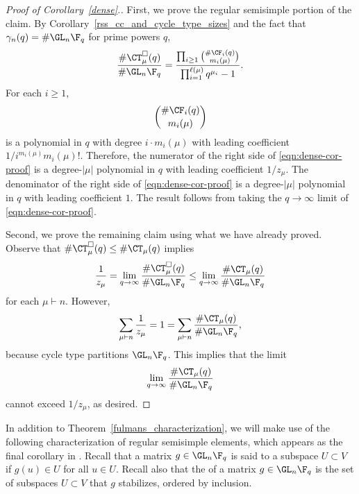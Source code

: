 \begin{proof}[Proof of Corollary~\ref{dense}.]
First, we prove the regular semisimple portion of the claim.
By Corollary~\ref{rss_cc_and_cycle_type_sizes} and the fact that \(\gamma_n (q) = \# \GL_n \F_q\) for prime powers \(q\),
\begin{equation}
\label{eqn:dense-cor-proof}
\frac{\#\CT_\mu^\Box (q)}{\# \GL_n \F_q} = \frac{\prod_{i \geq 1} \binom{\# \CF_i (q)}{m_i(\mu)}}{\prod_{i=1}^{\ell(\mu)} q^{\mu_i}-1}.
\end{equation}
For each \(i \geq 1\),
\begin{equation}
\binom{\# \CF_i (q)}{m_i (\mu)}
\end{equation}
is a polynomial in \(q\) with degree \(i \cdot m_i (\mu)\) with leading coefficient \(1 / i^{m_i(\mu)} m_i(\mu)!\).
Therefore, the numerator of the right side of \eqref{eqn:dense-cor-proof} is a degree-\(|\mu|\) polynomial in \(q\) with leading coefficient \(1 / z_\mu\).
The denominator of the right side of \eqref{eqn:dense-cor-proof} is a degree-\(|\mu|\) polynomial in \(q\) with leading coefficient \(1\).
The result follows from taking the \(q \to \infty\) limit of \eqref{eqn:dense-cor-proof}.

Second, we prove the remaining claim using what we have already proved.
Observe that \(\# \CT_\mu^\Box (q) \leq \# \CT_\mu (q)\) implies
\begin{equation}
\frac{1}{z_\mu}
=
\lim_{q \to \infty}
\frac{\# \CT_\mu^\Box (q)}{\# \GL_n \F_q}
\leq
\lim_{q \to \infty} \frac{\# \CT_\mu (q)}{\# \GL_n \F_q}
\end{equation}
for each \(\mu \vdash n\).
However,
\begin{equation}
	\sum_{\mu \vdash n}
	\frac{1}{z_\mu}
	=
	1
	=
	\sum_{\mu \vdash n}
	\frac{\# \CT_\mu (q)}{\# \GL_n \F_q},
\end{equation}
because cycle type partitions \(\GL_n \F_q\).
This implies that the limit
\begin{equation}
	\lim_{q \to \infty} \frac{\# \CT_\mu (q)}{\# \GL_n \F_q}
\end{equation}
cannot exceed \(1 / z_\mu\), as desired.
\end{proof}




In addition to Theorem~\ref{fulmans_characterization}, we will make use of the following characterization of regular semisimple elements, which appears as the final corollary in \cite[Section~3]{lattice}.
Recall that a matrix \(g \in \GL_n \F_q\) is said to  a subspace \(U \subset V\) if \(g(u) \in U\) for all \(u \in U\).
Recall also that the  of a matrix $g \in \GL_n \F_q$ is the set of subspaces $U \subset V$ that \(g\) stabilizes, ordered by inclusion.

